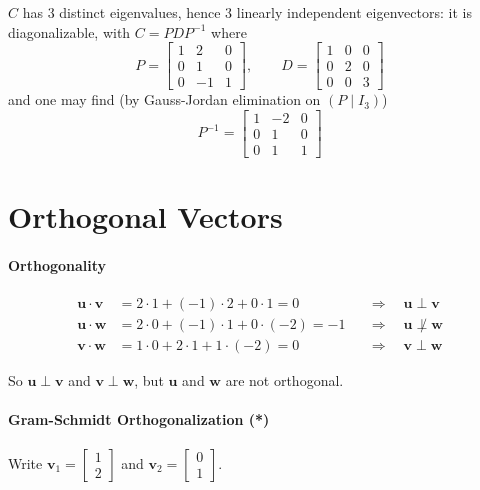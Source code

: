 \documentclass[]{article}
\begin{document}
	$C$ has $3$ distinct eigenvalues, hence $3$ linearly independent eigenvectors: it is diagonalizable, with $C = P D P^{-1}$ where
	$$P = \begin{bmatrix} 1 & 2 & 0 \\ 0 & 1 & 0 \\ 0 & -1 & 1 \end{bmatrix}, \qquad
	D = \begin{bmatrix} 1 & 0 & 0 \\ 0 & 2 & 0 \\ 0 & 0 & 3 \end{bmatrix}$$
	and one may find (by Gauss-Jordan elimination on $\left(P \mid I_3\right)$)
	$$P^{-1} = \begin{bmatrix} 1 & -2 & 0 \\ 0 & 1 & 0 \\ 0 & 1 & 1 \end{bmatrix}$$


	\section{Orthogonal Vectors}
	\paragraph{Orthogonality}\mbox{}

	\begin{align*}
		\mathbf{u} \cdot \mathbf{v} &= 2 \cdot 1 + (-1) \cdot 2 + 0 \cdot 1 = 0 &&\Longrightarrow \quad \mathbf{u} \perp \mathbf{v} \\
		\mathbf{u} \cdot \mathbf{w} &= 2 \cdot 0 + (-1) \cdot 1 + 0 \cdot (-2) = -1 &&\Longrightarrow \quad \mathbf{u} \not\perp \mathbf{w} \\
		\mathbf{v} \cdot \mathbf{w} &= 1 \cdot 0 + 2 \cdot 1 + 1 \cdot (-2) = 0 &&\Longrightarrow \quad \mathbf{v} \perp \mathbf{w}
	\end{align*}

	So $\mathbf{u} \perp \mathbf{v}$ and $\mathbf{v} \perp \mathbf{w}$, but $\mathbf{u}$ and $\mathbf{w}$ are not orthogonal.

	\paragraph{Gram-Schmidt Orthogonalization (*)}\mbox{}

	Write $\mathbf{v}_1 = \begin{bmatrix} 1 \\ 2 \end{bmatrix}$ and $\mathbf{v}_2 = \begin{bmatrix} 0 \\ 1 \end{bmatrix}$.
\end{document}
